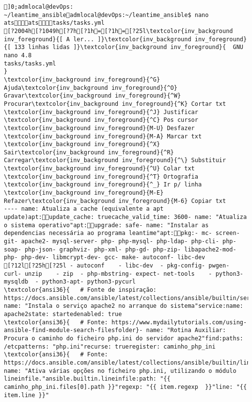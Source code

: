 \documentclass{scrartcl}
\title{}
\begin{document}
\begin{Verbatim}
]0;admlocal@devOps: ~/leantime_ansibleadmlocal@devOps:~/leantime_ansible$ nano atsatstasks/tasks.yml 
[?2004h[?1049h[?7h[?1h=[?1h=[?25l\textcolor{inv_background inv_foreground}{[ A ler... ]}\textcolor{inv_background inv_foreground}{[ 133 linhas lidas ]}\textcolor{inv_background inv_foreground}{  GNU nano 4.8                                                tasks/tasks.yml                                                             }
\textcolor{inv_background inv_foreground}{^G} Ajuda\textcolor{inv_background inv_foreground}{^O} Gravar\textcolor{inv_background inv_foreground}{^W} Procurar\textcolor{inv_background inv_foreground}{^K} Cortar txt    \textcolor{inv_background inv_foreground}{^J} Justificar    \textcolor{inv_background inv_foreground}{^C} Pos cursor    \textcolor{inv_background inv_foreground}{M-U} Desfazer     \textcolor{inv_background inv_foreground}{M-A} Marcar txt
\textcolor{inv_background inv_foreground}{^X} Sair\textcolor{inv_background inv_foreground}{^R} Carregar\textcolor{inv_background inv_foreground}{^\} Substituir    \textcolor{inv_background inv_foreground}{^U} Colar txt     \textcolor{inv_background inv_foreground}{^T} Ortografia    \textcolor{inv_background inv_foreground}{^_} Ir p/ linha   \textcolor{inv_background inv_foreground}{M-E} Refazer\textcolor{inv_background inv_foreground}{M-6} Copiar txt
---- name: Atualiza a cache (equivalente a apt update)apt:update_cache: truecache_valid_time: 3600- name: "Atualiza o sistema operativo"apt:upgrade: safe- name: "Instalar as dependencias necessária ao programa leantime"apt:pkg:- mc- screen- git- apache2- mysql-server- php- php-mysql- php-ldap- php-cli- php-soap- php-json- graphviz- php-xml- php-gd- php-zip- libapache2-mod-php- php-dev- libmcrypt-dev- gcc- make- autoconf- libc-dev
[?12l[?25h[?25l - autoconf    - libc-dev  - pkg-config- pwgen- curl- unzip    - zip  - php-mbstring- expect- net-tools    - python3-mysqldb  - python3-apt- python3-pycurl
\textcolor{ansi36}{   # Fonte de inspiração: https://docs.ansible.com/ansible/latest/collections/ansible/builtin/service_module.html}- name: "Instala o serviço apache2 no arranque do sistema"service:name: apache2state: startedenabled: true
\textcolor{ansi36}{   # Fonte: https://www.mydailytutorials.com/using-ansible-find-module-search-filesfolder}- name: "Rotina Auxiliar: Procura o caminho do ficheiro php.ini do servidor apache2"find:paths: /etcpatterns: "php.ini"recurse: trueregister: caminho_php_ini
\textcolor{ansi36}{   # Fonte: https://docs.ansible.com/ansible/latest/collections/ansible/builtin/lineinfile_module.html}- name: "Ativa várias opções no ficheiro php.ini, utilizando o módulo lineinfile."ansible.builtin.lineinfile:path: "{{ caminho_php_ini.files[0].path }}"regexp: "{{ item.regexp  }}"line: "{{ item.line }}"

\end{Verbatim}
\end{document}
